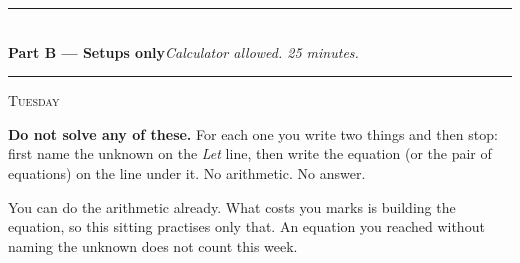 \documentclass[11pt,a4paper]{article}
\newif\ifANSWERS
\newcommand{\PartHead}[2]{%
  \vspace{6pt}
  {\color{navy}\rule{\textwidth}{0.8pt}}\\[2pt]
  {\large\bfseries\color{navy}#1}\hfill{\small\itshape #2}\\[-4pt]
  {\color{navy}\rule{\textwidth}{0.4pt}}
  \vspace{4pt}
}
\newcommand{\sitting}[1]{{\footnotesize\textsc{\color{navy}#1}}\par\vspace{2pt}}
\newcommand{\note}[1]{\par{\footnotesize\color{keyred}#1}}
\newcommand{\note}[1]{}
\begin{document}
\ifANSWERS
\note{\textbf{Marking rule: below 8 of 10 means an earlier week has decayed.} Find which one --- items 1--3 are Week 1, items 4--6 are Week 2, items 7--10 are Week 3 --- and repair that one before any translation work.}
\fi

\ifANSWERS\else\newpage\fi
\PartHead{Part B --- Setups only}{Calculator allowed. 25 minutes.}
\sitting{Tuesday}
\textbf{Do not solve any of these.} For each one you write two things and then stop:
first name the unknown on the \emph{Let} line, then write the equation (or the pair of
equations) on the line under it. No arithmetic. No answer.

You can do the arithmetic already. What costs you marks is building the equation, so
this sitting practises only that. An equation you reached without naming the unknown
does not count this week.
\end{document}

